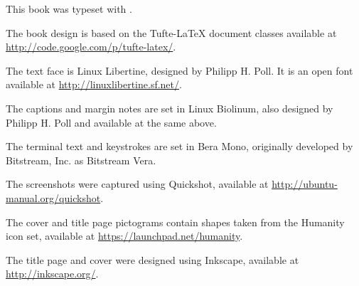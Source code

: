 
\thispagestyle{empty}

\null\vfill


\begin{fullwidth}
\small
\parindent0pt
\parskip\baselineskip


This book was typeset with \XeLaTeX.

The book design is based on the Tufte-\LaTeX{} document classes available at \url{http://code.google.com/p/tufte-latex/}.

The text face is Linux Libertine, designed by Philipp H. Poll.  It is an open font available at \url{http://linuxlibertine.sf.net/}.

The captions and margin notes are set in Linux Biolinum, also designed by Philipp H. Poll and available at the same  above.

The terminal text and keystrokes are set in Bera Mono, originally developed by Bitstream, Inc. as Bitstream Vera.

The screenshots were captured using Quickshot, available at \url{http://ubuntu-manual.org/quickshot}.

The cover and title page pictograms contain shapes taken from the Humanity icon set, available at \url{https://launchpad.net/humanity}.

The title page and cover were designed using Inkscape, available at \url{http://inkscape.org/}.

\end{fullwidth}

